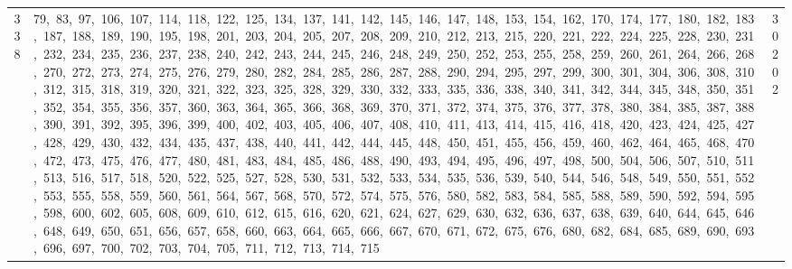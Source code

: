 \begin{longtable}{c|p{}|r}
338 & 79,\ 83,\ 97,\ 106,\ 107,\ 114,\ 118,\ 122,\ 125,\ 134,\ 137,\ 141,\ 142,\ 145,\ 146,\ 147,\ 148,\ 153,\ 154,\ 162,\ 170,\ 174,\ 177,\ 180,\ 182,\ 183,\ 187,\ 188,\ 189,\ 190,\ 195,\ 198,\ 201,\ 203,\ 204,\ 205,\ 207,\ 208,\ 209,\ 210,\ 212,\ 213,\ 215,\ 220,\ 221,\ 222,\ 224,\ 225,\ 228,\ 230,\ 231,\ 232,\ 234,\ 235,\ 236,\ 237,\ 238,\ 240,\ 242,\ 243,\ 244,\ 245,\ 246,\ 248,\ 249,\ 250,\ 252,\ 253,\ 255,\ 258,\ 259,\ 260,\ 261,\ 264,\ 266,\ 268,\ 270,\ 272,\ 273,\ 274,\ 275,\ 276,\ 279,\ 280,\ 282,\ 284,\ 285,\ 286,\ 287,\ 288,\ 290,\ 294,\ 295,\ 297,\ 299,\ 300,\ 301,\ 304,\ 306,\ 308,\ 310,\ 312,\ 315,\ 318,\ 319,\ 320,\ 321,\ 322,\ 323,\ 325,\ 328,\ 329,\ 330,\ 332,\ 333,\ 335,\ 336,\ 338,\ 340,\ 341,\ 342,\ 344,\ 345,\ 348,\ 350,\ 351,\ 352,\ 354,\ 355,\ 356,\ 357,\ 360,\ 363,\ 364,\ 365,\ 366,\ 368,\ 369,\ 370,\ 371,\ 372,\ 374,\ 375,\ 376,\ 377,\ 378,\ 380,\ 384,\ 385,\ 387,\ 388,\ 390,\ 391,\ 392,\ 395,\ 396,\ 399,\ 400,\ 402,\ 403,\ 405,\ 406,\ 407,\ 408,\ 410,\ 411,\ 413,\ 414,\ 415,\ 416,\ 418,\ 420,\ 423,\ 424,\ 425,\ 427,\ 428,\ 429,\ 430,\ 432,\ 434,\ 435,\ 437,\ 438,\ 440,\ 441,\ 442,\ 444,\ 445,\ 448,\ 450,\ 451,\ 455,\ 456,\ 459,\ 460,\ 462,\ 464,\ 465,\ 468,\ 470,\ 472,\ 473,\ 475,\ 476,\ 477,\ 480,\ 481,\ 483,\ 484,\ 485,\ 486,\ 488,\ 490,\ 493,\ 494,\ 495,\ 496,\ 497,\ 498,\ 500,\ 504,\ 506,\ 507,\ 510,\ 511,\ 513,\ 516,\ 517,\ 518,\ 520,\ 522,\ 525,\ 527,\ 528,\ 530,\ 531,\ 532,\ 533,\ 534,\ 535,\ 536,\ 539,\ 540,\ 544,\ 546,\ 548,\ 549,\ 550,\ 551,\ 552,\ 553,\ 555,\ 558,\ 559,\ 560,\ 561,\ 564,\ 567,\ 568,\ 570,\ 572,\ 574,\ 575,\ 576,\ 580,\ 582,\ 583,\ 584,\ 585,\ 588,\ 589,\ 590,\ 592,\ 594,\ 595,\ 598,\ 600,\ 602,\ 605,\ 608,\ 609,\ 610,\ 612,\ 615,\ 616,\ 620,\ 621,\ 624,\ 627,\ 629,\ 630,\ 632,\ 636,\ 637,\ 638,\ 639,\ 640,\ 644,\ 645,\ 646,\ 648,\ 649,\ 650,\ 651,\ 656,\ 657,\ 658,\ 660,\ 663,\ 664,\ 665,\ 666,\ 667,\ 670,\ 671,\ 672,\ 675,\ 676,\ 680,\ 682,\ 684,\ 685,\ 689,\ 690,\ 693,\ 696,\ 697,\ 700,\ 702,\ 703,\ 704,\ 705,\ 711,\ 712,\ 713,\ 714,\ 715 & 30202 \\

\end{longtable}
